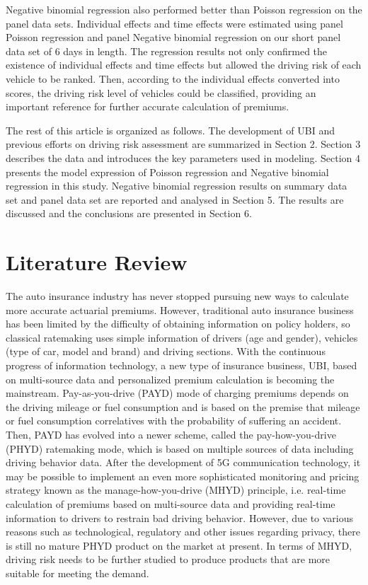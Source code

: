 \documentclass[num-refs]{wiley-article}
\begin{document}
Negative binomial regression also performed better than Poisson regression on the panel data sets. Individual effects and time effects were estimated using panel Poisson regression and panel Negative binomial regression on our short panel data set of 6 days in length. The regression results not only confirmed the existence of individual effects and time effects but allowed the driving risk of each vehicle to be ranked. Then, according to the individual effects converted into scores, the driving risk level of vehicles could be classified, providing an important reference for further accurate calculation of premiums.

The rest of this article is organized as follows. The development of UBI and previous efforts on driving risk assessment are summarized in Section 2. Section 3 describes the data and introduces the key parameters used in modeling. Section 4 presents the model expression of Poisson regression and Negative binomial regression in this study. Negative binomial regression results on summary data set and panel data set are reported and analysed in Section 5. The results are discussed and the conclusions are presented in Section 6.


\section{Literature Review}
The auto insurance industry has never stopped pursuing new ways to calculate more accurate actuarial premiums. However, traditional auto insurance business has been limited by the difficulty of obtaining information on policy holders, so classical ratemaking uses simple information of drivers (age and gender), vehicles (type of car, model and brand) and driving sections\cite{litman2007distance}. With the continuous progress of information technology, a new type of insurance business, UBI, based on multi-source data and personalized premium calculation is becoming the mainstream. Pay-as-you-drive (PAYD) mode of charging premiums depends on the driving mileage or fuel consumption and is based on the premise that mileage or fuel consumption correlatives with the probability of suffering an accident\cite{tselentis2016innovative}. Then, PAYD has evolved into a newer scheme, called the pay-how-you-drive (PHYD) ratemaking mode, which is based on multiple sources of data including driving behavior data\cite{paefgen2013evaluation}. After the development of 5G communication technology, it may be possible to implement an even more sophisticated monitoring and pricing strategy known as the manage-how-you-drive (MHYD) principle, i.e. real-time calculation of premiums based on multi-source data and providing real-time information to drivers to restrain bad driving behavior\cite{litman2007distance,tselentis2017innovative}. However, due to various reasons such as technological, regulatory and other issues regarding privacy\cite{troncoso2010pripayd}, there is still no mature PHYD product on the market at present\cite{pesantez2019predicting,guillen2019use}. In terms of MHYD, driving risk needs to be further studied to produce products that are more suitable for meeting the demand\cite{sun2020assessing}.
\end{document}
